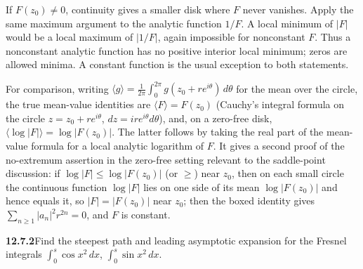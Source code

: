 If $F(z_0)\ne0$, continuity gives a smaller disk where $F$ never
vanishes. Apply the same maximum argument to the analytic function
$1/F$. A local minimum of $|F|$ would be a local maximum of $|1/F|$,
again impossible for nonconstant $F$. Thus a nonconstant analytic
function has no positive interior local minimum; zeros are allowed
minima. A constant function is the usual exception to both statements.

For comparison, writing
$\langle g\rangle=\frac1{2\pi}\int_0^{2\pi}g(z_0+re^{i\theta})\,d\theta$
for the mean over the circle, the true mean-value identities are
$\langle F\rangle=F(z_0)$ (Cauchy's integral formula on the circle
$z=z_0+re^{i\theta}$, $dz=ire^{i\theta}d\theta$), and, on a zero-free
disk, $\langle\log|F|\rangle=\log|F(z_0)|$. The latter follows by taking
the real part of the mean-value formula for a local analytic logarithm
of $F$. It gives a second proof of the no-extremum assertion in the
zero-free setting relevant to the saddle-point discussion: if
$\log|F|\le\log|F(z_0)|$ (or $\ge$) near $z_0$, then on each small
circle the continuous function $\log|F|$ lies on one side of its mean
$\log|F(z_0)|$ and hence equals it, so $|F|=|F(z_0)|$ near $z_0$; then
the boxed identity gives $\sum_{n\ge1}|a_n|^2r^{2n}=0$, and $F$ is
constant.

\par\bigskip
\noindent\textbf{12.7.2}\quad Find the steepest path and leading asymptotic
expansion  for the Fresnel integrals
$\displaystyle\int_{0}^{s}\cos x^{2}\,dx$,\quad
$\displaystyle\int_{0}^{s}\sin x^{2}\,dx$.

